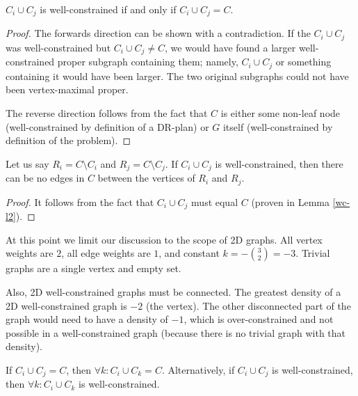 \begin{lemma}\label{wc-l2}
$C_i\cup C_j$ is well-constrained if and only if $C_i\cup C_j = C$.
\end{lemma}

\begin{proof}
The forwards direction can be shown with a contradiction. If the $C_i\cup C_j$ was well-constrained but $C_i\cup C_j \neq C$, we would have found a larger well-constrained proper subgraph containing them; namely, $C_i\cup C_j$ or something containing it would have been larger. The two original subgraphs could not have been vertex-maximal proper.

The reverse direction follows from the fact that $C$ is either some non-leaf node (well-constrained by definition of a DR-plan) or $G$ itself (well-constrained by definition of the problem).
\end{proof}

\begin{corollary}\label{wc-c1}
Let us say $R_i=C\setminus C_i$ and $R_j=C\setminus C_j$. If $C_i\cup C_j$ is well-constrained, then there can be no edges in $C$ between the vertices of $R_i$ and $R_j$.
\end{corollary}

\begin{proof}
It follows from the fact that $C_i\cup C_j$ must equal $C$ (proven in Lemma \ref{wc-l2}).
\end{proof}



At this point we limit our discussion to the scope of 2D graphs. All vertex weights are $2$, all edge weights are $1$, and constant $k= -{{3}\choose{2}}=-3$. Trivial graphs are a single vertex and empty set.

Also, 2D well-constrained graphs must be connected.
The greatest density of a 2D well-constrained graph is $-2$ (the vertex). The other disconnected part of the graph would need to have a density of $-1$, which is over-constrained and not possible in a well-constrained graph (because there is no trivial graph with that density).

\begin{lemma}\label{wc-l3}
If $C_i\cup C_j=C$, then $\forall k: C_i\cup C_k=C$.
Alternatively, if $C_i\cup C_j$ is well-constrained, then $\forall k: C_i\cup C_k$ is well-constrained.
\end{lemma}

